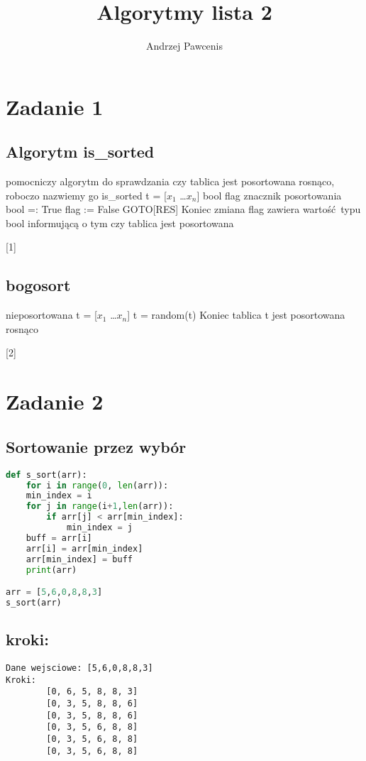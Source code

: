 \documentclass{article}
\title{Algorytmy lista 2}
\author{Andrzej Pawcenis}
\begin{document}
	\maketitle
	\section{Zadanie 1}
		\subsection{Algorytm is\_sorted}
			\begin{algorithmic}[1]
				\State pomocniczy algorytm do sprawdzania czy tablica jest posortowana rosnąco, roboczo nazwiemy go is\_sorted
				\Require t = [\(x_1\) \dots \(x_n\)]
				\State bool flag znacznik posortowania
				\State bool =: True
						\State flag := False
						\State GOTO[RES]
					\EndIf
				\EndFor
				\State[RES] Koniec zmiana flag zawiera wartość typu bool informującą o tym czy tablica jest posortowana
			\end{algorithmic}[1]
		\subsection{bogosort}
			\begin{algorithmic}[2]
				\Require nieposortowana t = [\(x_1\) \dots \(x_n\)]
					\State t = random(t)
				\EndWhile
				\State Koniec tablica t jest posortowana rosnąco
			\end{algorithmic}[2]
	\section{Zadanie 2}
		\subsection{Sortowanie przez wybór}
			\begin{lstlisting}[language=Python, caption=implemtacja algorytmu sortowania przez wybór]
def s_sort(arr):
	for i in range(0, len(arr)):
	min_index = i
	for j in range(i+1,len(arr)):
		if arr[j] < arr[min_index]:
			min_index = j
	buff = arr[i]
	arr[i] = arr[min_index]
	arr[min_index] = buff
	print(arr)

arr = [5,6,0,8,8,3]
s_sort(arr)
			\end{lstlisting}
		\subsection{kroki:}
		\begin{lstlisting}
Dane wejsciowe: [5,6,0,8,8,3]
Kroki:
		[0, 6, 5, 8, 8, 3]
		[0, 3, 5, 8, 8, 6]
		[0, 3, 5, 8, 8, 6]
		[0, 3, 5, 6, 8, 8]
		[0, 3, 5, 6, 8, 8]
		[0, 3, 5, 6, 8, 8]
\end{lstlisting}
\end{document}
